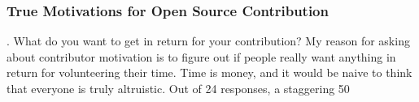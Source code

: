 \subsubsection{True Motivations for Open Source Contribution}
{. What do you want to get in return for your contribution?} My reason for asking about contributor motivation is to figure out if people really want anything in return for volunteering their time. Time is money, and it would be naive to think that everyone is truly altruistic. Out of 24 responses, a {\italic staggering} 50%
